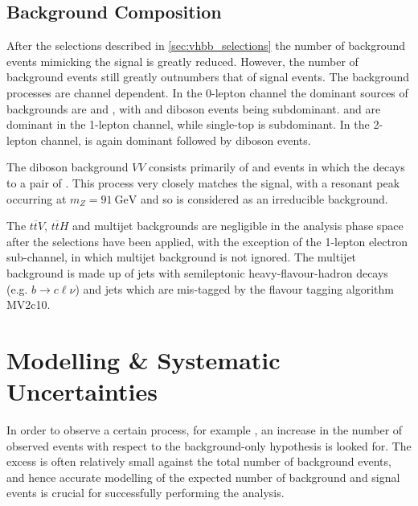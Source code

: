 \subsection{Background Composition}

After the selections described in \cref{sec:vhbb_selections} the number of background events mimicking the \VHbb signal is greatly reduced.
However, the number of background events still greatly outnumbers that of signal events.
The background processes are channel dependent.
In the 0-lepton channel the dominant sources of backgrounds are \Zjets and \ttbar, with \Wjets and diboson events being subdominant.
\ttbar and \Wjets are dominant in the 1-lepton channel, while single-top is subdominant.
In the 2-lepton channel, \Zjets is again dominant followed by \Zboson\Zboson diboson events.

The diboson background $VV$ consists primarily of \Wboson\Zboson and \Zboson\Zboson events in which the \Zboson decays to a pair of \bquarks.
This process very closely matches the signal, with a resonant peak occurring at $m_Z = \SI{91}{\GeV}$ and so is considered as an 
irreducible background.

The $t\overline{t} V$, $t\overline{t} H$ and multijet backgrounds are negligible in the analysis phase space after the selections have been applied, with the exception of the 1-lepton electron sub-channel, in which multijet background is not ignored.
The multijet background is made up of jets with semileptonic heavy-flavour-hadron decays (e.g. $b \to c \ell \nu$) and jets which are mis-tagged by the flavour tagging algorithm MV2c10.


\section{Modelling \& Systematic Uncertainties}\label{sec:vhbb_modelling}


In order to observe a certain process, for example \VHbb, an increase in the number of observed events with respect to the background-only hypothesis is looked for.
The excess is often relatively small against the total number of background events, and hence accurate modelling of the expected number of background and signal events is crucial for successfully performing the analysis.

